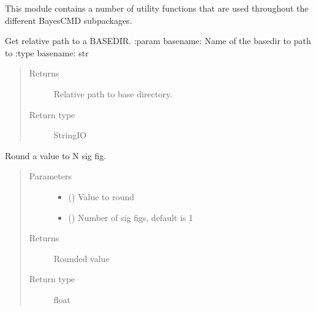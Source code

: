 \documentclass[letterpaper,10pt,english]{sphinxmanual}
\begin{document}
This module contains a number of utility functions that are used throughout
the different BayesCMD subpackages.

\begin{fulllineitems}
\label{\detokenize{misc:bayescmd.util.findBaseDir}}
Get relative path to a BASEDIR.
:param basename: Name of the basedir to path to
:type basename: str
\begin{quote}\begin{description}
\item[{Returns}] \leavevmode
Relative path to base directory.

\item[{Return type}] \leavevmode
StringIO

\end{description}\end{quote}

\end{fulllineitems}


\begin{fulllineitems}
\label{\detokenize{misc:bayescmd.util.round_sig}}
Round a value to N sig fig.
\begin{quote}\begin{description}
\item[{Parameters}] \leavevmode\begin{itemize}
\item {} 
 () \textendash{} Value to round

\item {} 
 (\sphinxstyleliteralemphasis{, }) \textendash{} Number of sig figs, default is 1

\end{itemize}

\item[{Returns}] \leavevmode
Rounded value

\item[{Return type}] \leavevmode
float

\end{description}\end{quote}

\end{fulllineitems}
\end{document}

